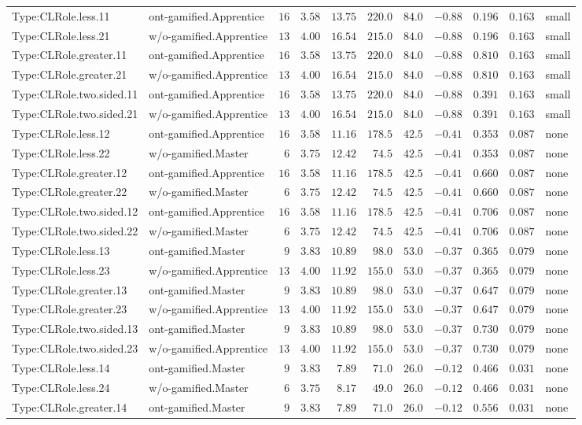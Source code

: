 \documentclass[6pt,a4paper]{article}
\begin{document}
{\begin{longtable}{llrrrrrrrrl}
Type:CLRole.less.11&ont-gamified.Apprentice&$16$&$3.58$&$13.75$&$220.0$&$ 84.0$&$-0.88$&$0.196$&$0.163$&small\tabularnewline
Type:CLRole.less.21&w/o-gamified.Apprentice&$13$&$4.00$&$16.54$&$215.0$&$ 84.0$&$-0.88$&$0.196$&$0.163$&small\tabularnewline
Type:CLRole.greater.11&ont-gamified.Apprentice&$16$&$3.58$&$13.75$&$220.0$&$ 84.0$&$-0.88$&$0.810$&$0.163$&small\tabularnewline
Type:CLRole.greater.21&w/o-gamified.Apprentice&$13$&$4.00$&$16.54$&$215.0$&$ 84.0$&$-0.88$&$0.810$&$0.163$&small\tabularnewline
Type:CLRole.two.sided.11&ont-gamified.Apprentice&$16$&$3.58$&$13.75$&$220.0$&$ 84.0$&$-0.88$&$0.391$&$0.163$&small\tabularnewline
Type:CLRole.two.sided.21&w/o-gamified.Apprentice&$13$&$4.00$&$16.54$&$215.0$&$ 84.0$&$-0.88$&$0.391$&$0.163$&small\tabularnewline
Type:CLRole.less.12&ont-gamified.Apprentice&$16$&$3.58$&$11.16$&$178.5$&$ 42.5$&$-0.41$&$0.353$&$0.087$&none\tabularnewline
Type:CLRole.less.22&w/o-gamified.Master&$ 6$&$3.75$&$12.42$&$ 74.5$&$ 42.5$&$-0.41$&$0.353$&$0.087$&none\tabularnewline
Type:CLRole.greater.12&ont-gamified.Apprentice&$16$&$3.58$&$11.16$&$178.5$&$ 42.5$&$-0.41$&$0.660$&$0.087$&none\tabularnewline
Type:CLRole.greater.22&w/o-gamified.Master&$ 6$&$3.75$&$12.42$&$ 74.5$&$ 42.5$&$-0.41$&$0.660$&$0.087$&none\tabularnewline
Type:CLRole.two.sided.12&ont-gamified.Apprentice&$16$&$3.58$&$11.16$&$178.5$&$ 42.5$&$-0.41$&$0.706$&$0.087$&none\tabularnewline
Type:CLRole.two.sided.22&w/o-gamified.Master&$ 6$&$3.75$&$12.42$&$ 74.5$&$ 42.5$&$-0.41$&$0.706$&$0.087$&none\tabularnewline
Type:CLRole.less.13&ont-gamified.Master&$ 9$&$3.83$&$10.89$&$ 98.0$&$ 53.0$&$-0.37$&$0.365$&$0.079$&none\tabularnewline
Type:CLRole.less.23&w/o-gamified.Apprentice&$13$&$4.00$&$11.92$&$155.0$&$ 53.0$&$-0.37$&$0.365$&$0.079$&none\tabularnewline
Type:CLRole.greater.13&ont-gamified.Master&$ 9$&$3.83$&$10.89$&$ 98.0$&$ 53.0$&$-0.37$&$0.647$&$0.079$&none\tabularnewline
Type:CLRole.greater.23&w/o-gamified.Apprentice&$13$&$4.00$&$11.92$&$155.0$&$ 53.0$&$-0.37$&$0.647$&$0.079$&none\tabularnewline
Type:CLRole.two.sided.13&ont-gamified.Master&$ 9$&$3.83$&$10.89$&$ 98.0$&$ 53.0$&$-0.37$&$0.730$&$0.079$&none\tabularnewline
Type:CLRole.two.sided.23&w/o-gamified.Apprentice&$13$&$4.00$&$11.92$&$155.0$&$ 53.0$&$-0.37$&$0.730$&$0.079$&none\tabularnewline
Type:CLRole.less.14&ont-gamified.Master&$ 9$&$3.83$&$ 7.89$&$ 71.0$&$ 26.0$&$-0.12$&$0.466$&$0.031$&none\tabularnewline
Type:CLRole.less.24&w/o-gamified.Master&$ 6$&$3.75$&$ 8.17$&$ 49.0$&$ 26.0$&$-0.12$&$0.466$&$0.031$&none\tabularnewline
Type:CLRole.greater.14&ont-gamified.Master&$ 9$&$3.83$&$ 7.89$&$ 71.0$&$ 26.0$&$-0.12$&$0.556$&$0.031$&none\tabularnewline

\end{longtable}}
\end{document}
